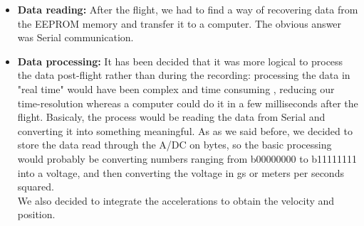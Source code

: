 \documentclass[12pt]{article}
\begin{document}
\begin{itemize}
		\item \textbf{Data reading:} After the flight, we had to find a way of recovering data from the EEPROM memory and transfer it to a computer. The obvious answer was Serial communication.
		\item \textbf{Data processing:} It has been decided that it was more logical to process the data post-flight rather than during the recording: processing the data in "real time" would have been complex and time consuming , reducing our time-resolution whereas a computer could do it in a few milliseconds after the flight. Basicaly, the process would be reading the data from Serial and converting it into something meaningful. As as we said before, we decided to store the data read through the A/DC on bytes, so the basic processing would probably be converting numbers ranging from b00000000 to b11111111 into a voltage, and then converting the voltage in gs or meters per seconds squared.\\
		We also decided to integrate the accelerations to obtain the velocity and position.
	\end{itemize}
\end{document}
